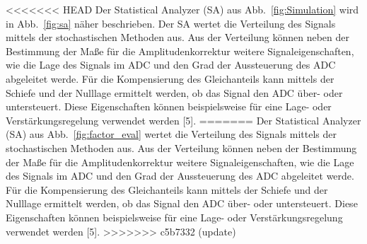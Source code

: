 
<<<<<<< HEAD
Der Statistical Analyzer (SA) aus Abb.~\ref{fig:Simulation} wird in Abb.~\ref{fig:sa} näher beschrieben. Der SA wertet die Verteilung des Signals mittels der stochastischen Methoden aus. Aus der Verteilung können neben der Bestimmung der Maße für die Amplitudenkorrektur weitere Signaleigenschaften, wie die Lage des Signals im ADC und den Grad der Aussteuerung des ADC abgeleitet werde. Für die Kompensierung des Gleichanteils kann mittels der Schiefe und der Nulllage ermittelt werden, ob das Signal den ADC über- oder  untersteuert. Diese Eigenschaften können beispielsweise für eine Lage- oder Verstärkungsregelung verwendet werden [5].
=======
Der Statistical Analyzer (SA) aus Abb.~\ref{fig:factor_eval} wertet die Verteilung des Signals mittels der stochastischen Methoden aus. Aus der Verteilung können neben der Bestimmung der Maße für die Amplitudenkorrektur weitere Signaleigenschaften, wie die Lage des Signals im ADC und den Grad der Aussteuerung des ADC abgeleitet werde. Für die Kompensierung des Gleichanteils kann mittels der Schiefe und der Nulllage ermittelt werden, ob das Signal den ADC über- oder  untersteuert. Diese Eigenschaften können beispielsweise für eine Lage- oder Verstärkungsregelung verwendet werden [5].
>>>>>>> c5b7332 (update)


